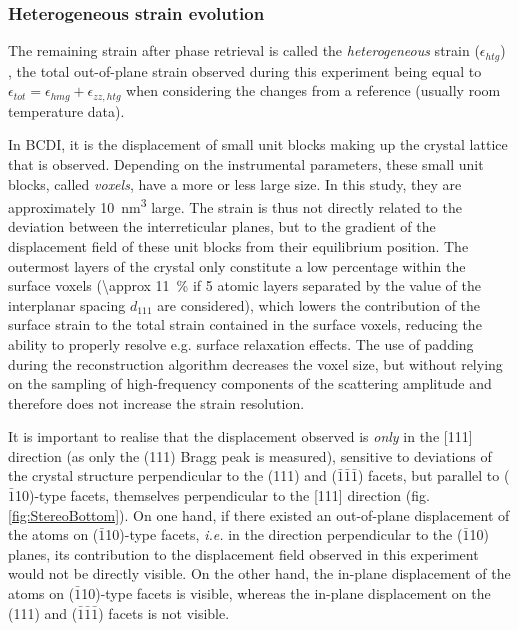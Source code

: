 {\subsubsection{Heterogeneous strain evolution}

The remaining strain after phase retrieval is called the \textit{heterogeneous} strain ($\epsilon_{htg}$) \parencite{Grediac1996, Favier2007, Atlan2023}, the total out-of-plane strain observed during this experiment being equal to $\epsilon_{tot} = \epsilon_{hmg} + \epsilon_{zz, htg}$ when considering the changes from a reference (usually room temperature data).

In BCDI, it is the displacement of small unit blocks making up the crystal lattice that is observed.
Depending on the instrumental parameters, these small unit blocks, called \textit{voxels}, have a more or less large size.
In this study, they are approximately \qty{10}{\nm^3} large.
The strain is thus not directly related to the deviation between the interreticular planes, but to the gradient of the displacement field of these unit blocks from their equilibrium position.
The outermost layers of the crystal only constitute a low percentage within the surface voxels (\qty{\approx 11}{\percent} if 5 atomic layers separated by the value of the interplanar spacing $d_{111}$ are considered), which lowers the contribution of the surface strain to the total strain contained in the surface voxels, reducing the ability to properly resolve e.g. surface relaxation effects.
The use of padding during the reconstruction algorithm decreases the voxel size, but without relying on the sampling of high-frequency components of the scattering amplitude and therefore does not increase the strain resolution.

It is important to realise that the displacement observed is \textit{only} in the [111] direction (as only the (111) Bragg peak is measured), sensitive to deviations of the crystal structure perpendicular to the (111) and ($\bar{1}\bar{1}\bar{1}$) facets, but parallel to ($\bar{1}$10)-type facets, themselves perpendicular to the [111] direction (fig. \ref{fig:StereoBottom}).
On one hand, if there existed an out-of-plane displacement of the atoms on ($\bar{1}$10)-type facets, \textit{i.e.} in the direction perpendicular to the ($\bar{1}$10) planes, its contribution to the displacement field observed in this experiment would not be directly visible.
On the other hand, the in-plane displacement of the atoms on ($\bar{1}$10)-type facets is visible, whereas the in-plane displacement on the (111) and ($\bar{1}\bar{1}\bar{1}$) facets is not visible.

}
